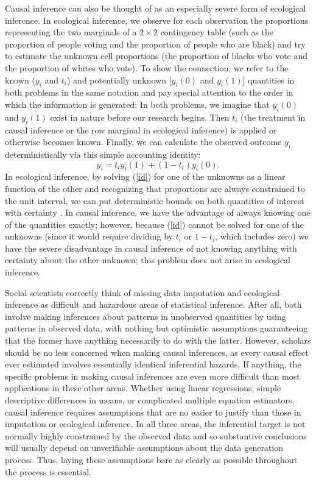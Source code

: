 \documentclass[11pt,titlepage]{article}
\begin{document}
Causal inference can also be thought of as an especially severe form
of ecological inference.  In ecological inference, we observe for each
observation the proportions representing the two marginals of a
$2\times 2$ contingency table (such as the proportion of people voting
and the proportion of people who are black) and try to estimate the
unknown cell proportions (the proportion of blacks who vote and the
proportion of whites who vote).  To show the connection, we refer to
the known ($y_i$ and $t_i$) and potentially unknown [$y_i(0)$ and
$y_i(1)$] quantities in both problems in the same notation and pay
special attention to the order in which the information is generated:
In both problems, we imagine that $y_i(0)$ and $y_i(1)$ exist in
nature before our research begins.  Then $t_i$ (the treatment in
causal inference or the row marginal in ecological inference) is
applied or otherwise becomes known.  Finally, we can calculate the
observed outcome $y_i$ deterministically via this simple accounting
identity:
\begin{equation}
  \label{id}
  y_i = t_iy_i(1) + (1-t_i)y_i(0).
\end{equation}
In ecological inference, by solving (\ref{id}) for one of the unknowns
as a linear function of the other and recognizing that proportions are
always constrained to the unit interval, we can put deterministic
bounds on both quantities of interest with certainty
\citep[][ch.5]{King97}.  In causal inference, we have the advantage of
always knowing one of the quantities exactly; however, because
(\ref{id}) cannot be solved for one of the unknowns (since it would
require dividing by $t_i$ or $1-t_i$, which includes zero) we have the
severe disadvantage in causal inference of not knowing anything with
certainty about the other unknown; this problem does not arise in
ecological inference.

Social scientists correctly think of missing data imputation and
ecological inference as difficult and hazardous areas of statistical
inference.  After all, both involve making inferences about patterns
in unobserved quantities by using patterns in observed data, with
nothing but optimistic assumptions guaranteeing that the former have
anything necessarily to do with the latter.  However, scholars should
be no less concerned when making causal inferences, as every causal
effect ever estimated involves essentially identical inferential
hazards.  If anything, the specific problems in making causal
inferences are even more difficult than most applications in these
other areas.  Whether using linear regressions, simple
descriptive differences in means, or complicated multiple equation
estimators, causal inference requires assumptions that are no easier
to justify than those in imputation or ecological inference.  In all
three areas, the inferential target is not normally highly constrained
by the observed data and so substantive conclusions will usually
depend on unverifiable assumptions about the data generation process.
Thus, laying these assumptions bare as clearly as possible throughout
the process is essential.
\end{document}
